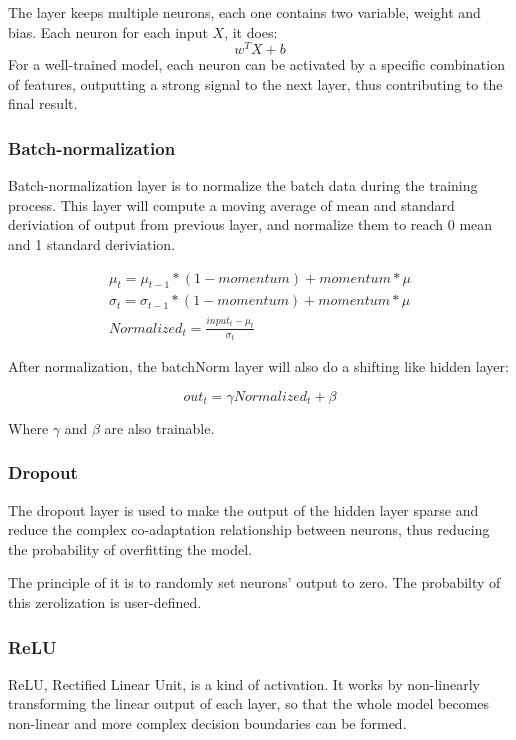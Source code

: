 \documentclass{article}[12pt]
\begin{document}
    The layer keeps multiple neurons, each one contains two variable, weight and bias.
    Each neuron for each input $X$, it does:
\[ w^T X+b\]
    For a well-trained model, each neuron can be activated by a specific combination of features,
    outputting a strong signal to the next layer, thus contributing to the final result.

\subsubsection{Batch-normalization}
    Batch-normalization layer is to normalize the batch data during the training process.
    This layer will compute a moving average of mean and standard deriviation of output from previous layer,
    and normalize them to reach 0 mean and 1 standard deriviation.

\begin{gather*}
    \mu_{t} = \mu_{t-1} * (1-momentum) + momentum *\mu\\
    \sigma_{t} = \sigma_{t-1} * (1-momentum) + momentum *\mu\\
    Normalized_{t} = \frac{input_{t} - \mu_{t}}{\sigma_{t}}
\end{gather*}

    After normalization, the batchNorm layer will also do a shifting like hidden layer:

\[ out_{t} = \gamma Normalized_{t} + \beta \]

    Where $\gamma$ and $\beta$ are also trainable.

\subsubsection{Dropout}
    The dropout layer is used to make the output of the hidden layer sparse and reduce the complex co-adaptation
    relationship between neurons, thus reducing the probability of overfitting the model.

    The principle of it is to randomly set neurons' output to zero.
    The probabilty of this zerolization is user-defined.

\subsubsection{ReLU}
    ReLU, Rectified Linear Unit, is a kind of activation.
    It works by non-linearly transforming the linear output of each layer, so that the whole model becomes non-linear
    and more complex decision boundaries can be formed.
\end{document}
